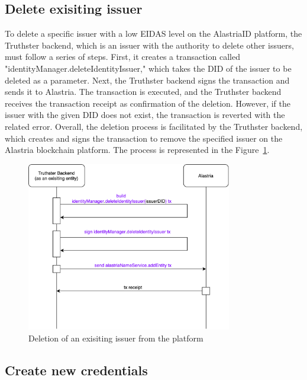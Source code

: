 \documentclass[target=mst,aauheader=]{thud}
\begin{document}
\subsection{Delete exisiting issuer}

To delete a specific issuer with a low EIDAS level on the AlastriaID platform, the Truthster backend, which is an issuer with the authority to delete other issuers, must follow a series of steps. First, it creates a transaction called "identityManager.deleteIdentityIssuer," which takes the DID of the issuer to be deleted as a parameter. Next, the Truthster backend signs the transaction and sends it to Alastria. The transaction is executed, and the Truthster backend receives the transaction receipt as confirmation of the deletion. However, if the issuer with the given DID does not exist, the transaction is reverted with the related error. Overall, the deletion process is facilitated by the Truthster backend, which creates and signs the transaction to remove the specified issuer on the Alastria blockchain platform.
The process is represented in the Figure~\ref{fig:deleteIssuer}.

\begin{figure}
    \centering
    \includegraphics[width=0.8\textwidth]{images/deleteExistingIssuer.png}
    \caption{Deletion of an exisiting issuer from the platform}
    \label{fig:deleteIssuer}
\end{figure}

\subsection{Create new credentials}
\end{document}

